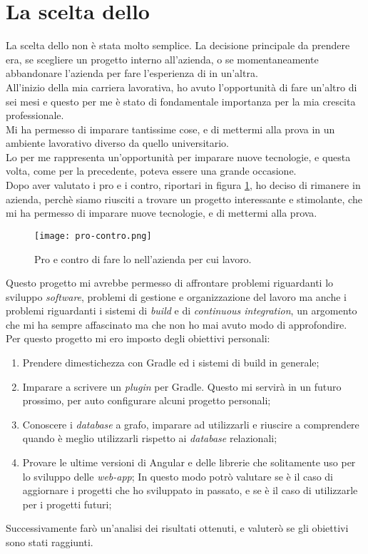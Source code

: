 \section{La scelta dello \stage{}}
La scelta dello \stage{} non è stata molto semplice. La decisione principale da prendere era, se scegliere un progetto interno all'azienda, o 
se momentaneamente abbandonare l'azienda per fare l'esperienza di \stage{} in un'altra.\\ 
All'inizio della mia carriera lavorativa, ho avuto l'opportunità di fare un'altro \stage{} di sei mesi e questo per me è stato di fondamentale
importanza per la mia crescita professionale.\\ Mi ha permesso di imparare tantissime cose, e di mettermi alla prova in un ambiente lavorativo
diverso da quello universitario.\\ 
Lo \stage{} per me rappresenta un'opportunità per imparare nuove tecnologie, e questa volta, come per la precedente, 
poteva essere una grande occasione. \\
Dopo aver valutato i pro e i contro, riportari in figura \ref*{fig:pro-contro}, ho deciso di rimanere in azienda, perchè siamo riusciti
a trovare un progetto interessante e stimolante, che mi ha permesso di imparare nuove tecnologie, e di mettermi alla prova.\\
\begin{figure}[!h] 
  \centering 
  \texttt{[image: pro-contro.png]}
  \caption{Pro e contro di fare lo \stage{} nell'azienda per cui lavoro.}
  \label{fig:pro-contro}
\end{figure}

Questo progetto mi avrebbe permesso di affrontare problemi riguardanti lo sviluppo \textit{software}, problemi di gestione e organizzazione del lavoro ma 
anche i problemi riguardanti i sistemi di \textit{build} e di \textit{continuous integration}, un argomento che mi ha sempre affascinato ma che non ho mai
avuto modo di approfondire.\\
Per questo progetto mi ero imposto degli obiettivi personali:
\begin{enumerate}
  \label{obiettivi-personali}
  \item Prendere dimestichezza con Gradle ed i sistemi di build in generale;
  \item Imparare a scrivere un \textit{plugin} per Gradle. Questo mi servirà in un futuro prossimo, per auto configurare alcuni progetto personali;
  \item Conoscere i \textit{database} a grafo, imparare ad utilizzarli e riuscire a comprendere quando è meglio utilizzarli rispetto ai \textit{database} relazionali;
  \item Provare le ultime versioni di Angular e delle librerie che solitamente uso per lo sviluppo delle \textit{web-app}; 
      In questo modo potrò valutare se è il caso di aggiornare i progetti che ho sviluppato in passato, e se è il caso di utilizzarle per i progetti futuri;
\end{enumerate}
Successivamente farò un'analisi dei risultati ottenuti, e valuterò se gli obiettivi sono stati raggiunti.\\
